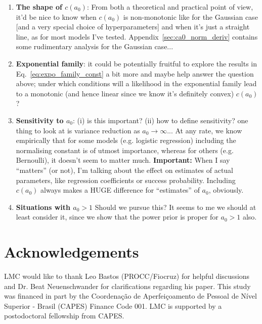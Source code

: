 \documentclass[a4paper, notitlepage, 11pt]{article}
\begin{document}
\begin{enumerate}
\item \textbf{The shape of $c(a_0)$}: From both a theoretical and practical point of view, it'd be nice to know when $c(a_0)$ is non-monotonic like for the Gaussian case [and a very special choice of hyperparameters] and when it's just a straight line, as for most models I've tested. 
Appendix~\ref{sec:ca0_norm_deriv} contains some rudimentary analysis for the Gaussian case...
\item \textbf{Exponential family}: it could be potentially fruitful to explore the results in Eq.~\ref{eq:expo_family_const} a bit more and maybe help answer the question above; under which conditions will a likelihood in the exponential family lead to a monotonic (and hence linear since we know it's definitely convex) $c(a_0)$?
\item \textbf{Sensitivity to $a_0$}: (i) is this important? (ii)  how to define sensitivity? one thing to look at is variance reduction as $a_0 \to \infty$...
At any rate, we know empirically that for some models (e.g. logistic regression) including the normalising constant is of utmost importance, whereas for others (e.g. Bernoulli), it doesn't seem to matter much.
\textbf{Important:} When I say ``matters'' (or not), I'm talking about the effect on estimates of actual parameters, like regression coefficients or success probability.
Including $c(a_0)$ always makes a HUGE difference for ``estimates'' of $a_0$, obviously.
\item \textbf{Situations with $a_0 > 1$} Should we pursue this? It seems to me we should at least consider it, since we show that the power prior is proper for $a_0 > 1$ also.
\end{enumerate}


\section*{Acknowledgements}

LMC would like to thank Leo Bastos (PROCC/Fiocruz) for helpful discussions and Dr. Beat Neuenschwander for clarifications regarding his paper.
This study was financed in part by the Coordenação de Aperfeiçoamento de Pessoal de Nível Superior - Brasil (CAPES) Finance Code 001.
LMC is supported by a postodoctoral fellowship from CAPES.
\end{document}
